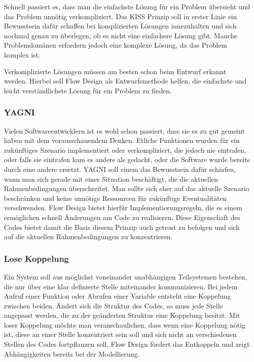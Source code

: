 Schnell passiert es, dass man die einfachste Lösung für ein Problem übersieht und das Problem unnötig verkompliziert.
Das KISS Prinzip soll  in erster Linie ein Bewusstsein dafür schaffen bei
komplizierten Lösungen innezuhalten und sich nochmal genau zu
überlegen, ob es nicht eine einfachere Lösung gibt.
Manche Problemdomänen erfordern jedoch eine komplexe Lösung, da das Problem
komplex ist.

Verkomplizierte Lösungen müssen am besten schon beim Entwurf erkannt werden.
Hierbei soll Flow Design als Entwurfsmethode helfen, die einfachste und leicht
verständlichste Lösung für ein Problem zu finden.

\subsubsection{YAGNI}

Vielen Softwareentwicklern ist es wohl schon passiert, dass sie es zu gut gemeint
haben mit dem vorausschauendem Denken. Etliche Funktionen wurden für ein
zukünftiges Szenario implementiert oder verkompliziert, die jedoch nie
eintrafen, oder falls sie eintrafen kam es anders als gedacht, oder die Software
wurde bereits durch eine andere ersetzt.
YAGNI soll einem das Bewusstsein dafür schärfen, wann man sich gerade mit einer
Situation beschäftigt, die die aktuellen Rahmenbedingungen überschreitet.
Man sollte sich eher auf das aktuelle Szenario beschränken und keine unnötige Ressourcen für zukünftige
Eventualitäten verschwenden.
Flow Design bietet hierfür Implementierungsregeln, die es einem ermöglichen
schnell Änderungen am Code zu realisieren.
Diese Eigenschaft des Codes bietet damit die Basis diesem Prinzip auch getrost
zu befolgen und sich auf die aktuellen Rahmenbedingungen zu konzentrieren.

\subsubsection{Lose Koppelung}

Ein System soll aus möglichst voneinander unabhängigen Teilsystemen bestehen,
die nur über eine  klar definierte Stelle miteinander kommunizieren.
Bei jedem Aufruf einer Funktion oder Abrufen einer Variable entsteht eine
Koppelung zwischen beiden.
Ändert sich die Struktur des Codes, so muss jede Stelle angepasst werden, die zu
der geänderten Struktur eine Koppelung besitzt. Mit loser Koppelung möchte man
veranschaulichen, dass wenn eine Koppelung nötig ist, diese an einer Stelle konzentriert sein soll und
sich nicht an verschiedenen Stellen des Codes fortpflanzen soll.
Flow Design fördert das Entkoppeln und zeigt Abhängigkeiten bereits bei der Modellierung.

